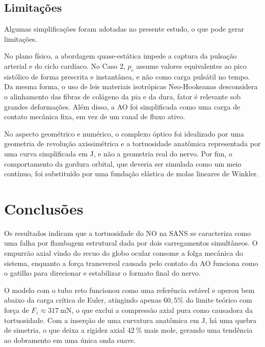 \documentclass[article, hidelinks,oneside,12pt]{abntex2}
\begin{document}
\subsection*{Limitações}
\label{sec:res-limitacoes}

Algumas simplificações foram adotadas no presente estudo, o que pode gerar limitações.

No plano físico, a abordagem quase-estática impede a captura da pulsação arterial e do ciclo cardíaco. No Caso 2, $p_c$ assume valores equivalentes ao pico sistólico de forma prescrita e instantânea, e não como carga pulsátil no tempo. Da mesma forma, o uso de leis materiais isotrópicas Neo-Hookeanas desconsidera o alinhamento das fibras de colágeno da pia e da dura, fator é relevante sob grandes deformações. Além disso, a AO foi simplificada como uma carga de contato mecânica fixa, em vez de um canal de fluxo ativo.

No aspecto geométrico e numérico, o complexo óptico foi idealizado por uma geometria de revolução axissimétrica e a tortuosidade anatômica representada por uma curva simplificada em J, e não a geometria real do nervo. Por fim, o comportamento da gordura orbital, que deveria ser simulada como um meio contínuo, foi substituído por uma fundação elástica de molas lineares de Winkler.



\section*{Conclusões}
\label{sec:conclusoes}

Os resultados indicam que a tortuosidade do NO na SANS se caracteriza como uma falha por flambagem estrutural dada por dois carregamentos simultâneos. O empurrão axial vindo do recuo do globo ocular consome a folga mecânica do sistema, enquanto a força transversal causada pelo contato da AO funciona como o gatilho para direcionar e estabilizar o formato final do nervo.

O modelo com o tubo reto funcionou como uma referência estável e operou bem abaixo da carga crítica de Euler, atingindo apenas $60{,}5\%$ do limite teórico com força de $F_z \approx \SI{317}{\milli\newton}$, o que exclui a compressão axial pura como causadora da tortuosidade. Com a inserção de uma curvatura anatômica em J, há uma quebra de simetria, o que deixa a rigidez axial $\SI{42}{\percent}$ mais mole, gerando uma tendência ao dobramento em uma única onda suave.
\end{document}
